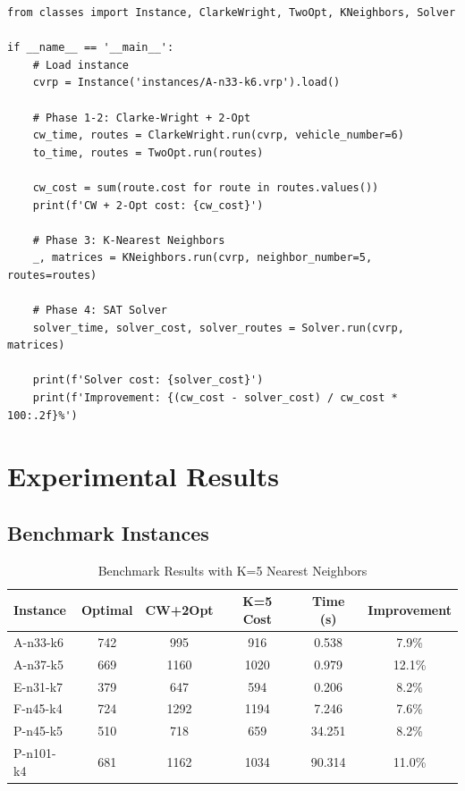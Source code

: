 \documentclass[12pt,a4paper]{article}
\theoremstyle{definition}
\begin{document}
\begin{lstlisting}[caption={Main Execution Script}]
from classes import Instance, ClarkeWright, TwoOpt, KNeighbors, Solver

if __name__ == '__main__':
    # Load instance
    cvrp = Instance('instances/A-n33-k6.vrp').load()
    
    # Phase 1-2: Clarke-Wright + 2-Opt
    cw_time, routes = ClarkeWright.run(cvrp, vehicle_number=6)
    to_time, routes = TwoOpt.run(routes)
    
    cw_cost = sum(route.cost for route in routes.values())
    print(f'CW + 2-Opt cost: {cw_cost}')
    
    # Phase 3: K-Nearest Neighbors
    _, matrices = KNeighbors.run(cvrp, neighbor_number=5, routes=routes)
    
    # Phase 4: SAT Solver
    solver_time, solver_cost, solver_routes = Solver.run(cvrp, matrices)
    
    print(f'Solver cost: {solver_cost}')
    print(f'Improvement: {(cw_cost - solver_cost) / cw_cost * 100:.2f}%')
\end{lstlisting}

\section{Experimental Results}

\subsection{Benchmark Instances}

\begin{table}[H]
\centering
\begin{tabular}{|l|c|c|c|c|c|}
\hline
\textbf{Instance} & \textbf{Optimal} & \textbf{CW+2Opt} & \textbf{K=5 Cost} & \textbf{Time (s)} & \textbf{Improvement} \\
\hline
A-n33-k6 & 742 & 995 & 916 & 0.538 & 7.9\% \\
A-n37-k5 & 669 & 1160 & 1020 & 0.979 & 12.1\% \\
E-n31-k7 & 379 & 647 & 594 & 0.206 & 8.2\% \\
F-n45-k4 & 724 & 1292 & 1194 & 7.246 & 7.6\% \\
P-n45-k5 & 510 & 718 & 659 & 34.251 & 8.2\% \\
P-n101-k4 & 681 & 1162 & 1034 & 90.314 & 11.0\% \\
\hline
\end{tabular}
\caption{Benchmark Results with K=5 Nearest Neighbors}
\end{table}
\end{document}
